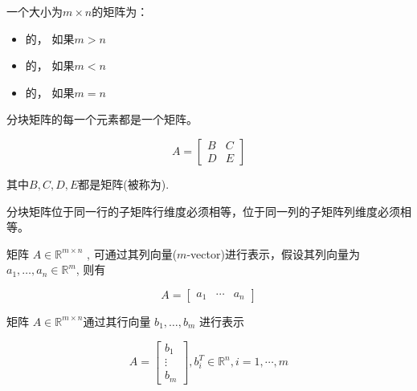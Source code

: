 \begin{definition}[高形， 宽形和方形矩阵]
    一个大小为$m\times n$的矩阵为：
    \begin{itemize}
        \item {}的， 如果$m>n$
        \item {}的， 如果$m<n$
        \item {}的， 如果$m=n$
    \end{itemize}
\end{definition}

\begin{definition}[分块矩阵]
    分块矩阵的每一个元素都是一个矩阵。

    \begin{equation} A=\left[\begin{array}{ll}B & C \\ D & E\end{array}\right] \end{equation}

    其中$B,C,D,E$都是矩阵(被称为).
\end{definition}

分块矩阵位于同一行的子矩阵行维度必须相等，位于同一列的子矩阵列维度必须相等。

\begin{definition}[矩阵的列向量表示]
    矩阵 $ A \in \mathbb{R}^{m \times n} $ , 可通过其列向量($m$-vector)进行表示，假设其列向量为 $ a_{1}, \ldots, a_{n} \in \mathbb{R}^{m} $, 则有

    \begin{equation} A=\left[\begin{array}{lll}a_{1} & \cdots & a_{n}\end{array}\right] \end{equation}
\end{definition}

\begin{definition}[矩阵的行向量表示]
    矩阵 $ A \in \mathbb{R}^{m \times n} $通过其行向量 $ b_{1}, \ldots, b_{m} $ 进行表示

    \begin{equation} A=\left[\begin{array}{c}b_{1} \\ \vdots \\ b_{m}\end{array}\right], b_{i}^{T} \in \mathbb{R}^{n}, i=1, \cdots, m \end{equation}
\end{definition}

